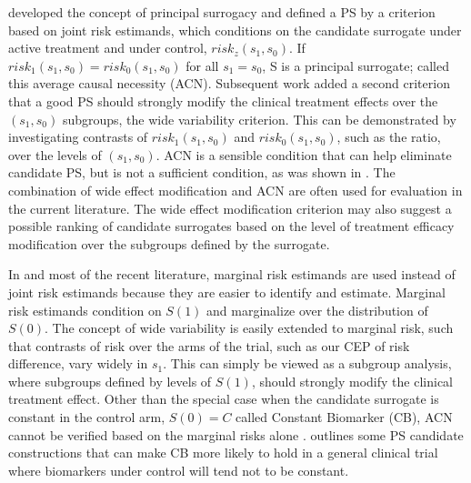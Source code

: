 \documentclass[times, doublespace]{simauth}
\begin{document}
\citet{Frangakis02} developed the concept of principal surrogacy and defined a PS by a criterion based on joint risk estimands, which conditions on the candidate surrogate under active treatment and under control, $risk_z(s_1,s_0)$. If $risk_1(s_1,s_0)=risk_0(s_1,s_0)$ for all $s_1 = s_0$, S is a principal surrogate; \citet{Gilbert08} called this average causal necessity (ACN). Subsequent work added a second criterion that a good PS should strongly modify the clinical treatment effects over the $(s_1, s_0)$ subgroups, the wide variability criterion. This can be demonstrated by investigating contrasts of $risk_1(s_1,s_0)$ and $risk_0(s_1,s_0)$, such as the ratio, over the levels of $(s_1, s_0)$. ACN is a sensible condition that can help eliminate candidate PS, but is not a sufficient condition, as was shown in \citet{Vanderweele11}. The combination of wide effect modification and ACN are often used for evaluation in the current literature. The wide effect modification criterion may also suggest a possible ranking of candidate surrogates based on the level of treatment efficacy modification over the subgroups defined by the surrogate. 

In \citet{Gilbert08} and most of the recent literature, marginal risk estimands are used instead of joint risk estimands because they are easier to identify and estimate. Marginal risk estimands condition on $S(1)$ and marginalize over the distribution of $S(0)$. The concept of wide variability is easily extended to marginal risk, such that contrasts of risk over the arms of the trial, such as our CEP of risk difference, vary widely in $s_1$. This can simply be viewed as a subgroup analysis, where subgroups defined by levels of $S(1)$, should strongly modify the clinical treatment effect. Other than the special case when the candidate surrogate is constant in the control arm, $S(0)=C$ called Constant Biomarker (CB), ACN cannot be verified based on the marginal risks alone \citep{Gilbert08, Gabriel13}. \citet{Gabriel13} outlines some PS candidate constructions that can make CB more likely to hold in a general clinical trial where biomarkers under control will tend not to be constant. 
  
\end{document}
